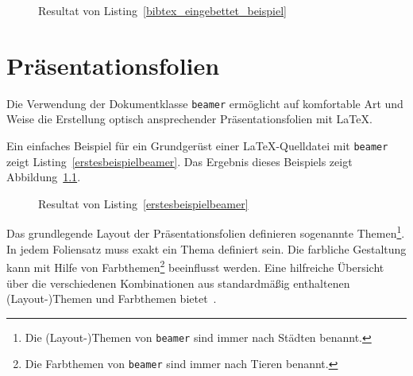 \documentclass[a4paper,10pt,twoside]{scrbook}
\begin{document}
{

\begin{figure}[H]
	\caption{Resultat von Listing~\ref{bibtex_eingebettet_beispiel}}
	\label{fig_bibtex_eingebettet_beispiel}
\end{figure}


\chapter{Präsentationsfolien}
\label{Kapitel_Praesentationsfolien}

Die Verwendung der Dokumentklasse \verb!beamer! ermöglicht auf komfortable Art und Weise die Erstellung optisch ansprechender Präsentationsfolien mit \LaTeX. 


Ein einfaches Beispiel für ein Grundgerüst einer \LaTeX-Quelldatei mit \verb|beamer| zeigt Listing~\ref{erstesbeispielbeamer}. Das Ergebnis dieses Beispiels zeigt Abbildung~\ref{fig_erstesbeispielbeamer}.





\begin{figure}[H]
	\caption{Resultat von Listing~\ref{erstesbeispielbeamer}}
	\label{fig_erstesbeispielbeamer}
\end{figure}



Das grundlegende Layout der Präsentationsfolien definieren sogenannte Themen\footnote{Die (Layout-)Themen von \texttt{beamer} sind immer nach Städten benannt.}. In jedem Foliensatz muss exakt ein Thema definiert sein. 
Die farbliche Gestaltung kann mit Hilfe von Farbthemen\footnote{Die Farbthemen von \texttt{beamer} sind immer nach Tieren benannt.} beeinflusst werden. Eine hilfreiche Übersicht über die verschiedenen Kombinationen aus standardmäßig enthaltenen (Layout-)Themen und Farbthemen bietet~\cite{BeamerThemeMatrixWebseite}. 

}
\end{document}
